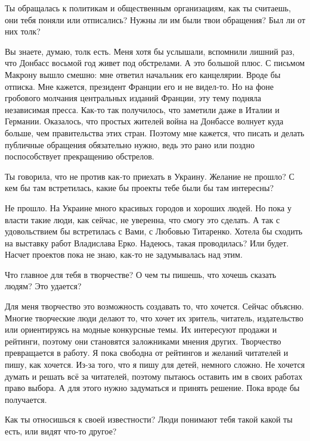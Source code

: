 Ты обращалась к политикам и общественным организациям, как ты считаешь, они
тебя поняли или отписались? Нужны ли им были твои обращения? Был ли от них
толк?

Вы знаете, думаю, толк есть. Меня хотя бы услышали, вспомнили лишний раз, что
Донбасс восьмой год живет под обстрелами. А это большой плюс. С письмом Макрону
вышло смешно: мне ответил начальник его канцелярии. Вроде бы отписка. Мне
кажется, президент Франции его и не видел-то. Но на фоне гробового молчания
центральных изданий Франции, эту тему подняла независимая пресса. Как-то так
получилось, что заметили даже в Италии и Германии. Оказалось, что простых
жителей война на Донбассе волнует куда больше, чем правительства этих стран.
Поэтому мне кажется, что писать и делать публичные обращения обязательно нужно,
ведь это рано или поздно поспособствует прекращению обстрелов.

Ты говорила, что не против как-то приехать в Украину. Желание не прошло? С кем
бы там встретилась, какие бы проекты тебе были бы там интересны?

Не прошло. На Украине много красивых городов и хороших людей. Но пока у власти
такие люди, как сейчас, не уверенна, что смогу это сделать. А так с
удовольствием бы встретилась с Вами, с Любовью Титаренко. Хотела бы сходить на
выставку работ Владислава Ерко. Надеюсь, такая проводилась? Или будет. Насчет
проектов пока не знаю, как-то не задумывалась над этим.

Что главное для тебя в творчестве? О чем ты пишешь, что хочешь сказать людям?
Это удается?

Для меня творчество это возможность создавать то, что хочется. Сейчас объясню.
Многие творческие люди делают то, что хочет их зритель, читатель, издательство
или ориентируясь на модные конкурсные темы. Их интересуют продажи и рейтинги,
поэтому они становятся заложниками мнения других. Творчество превращается в
работу. Я пока свободна от рейтингов и желаний читателей и пишу, как хочется.
Из-за того, что я пишу для детей, немного сложно. Не хочется думать и решать
всё за читателей, поэтому пытаюсь оставить им в своих работах право выбора. А
для этого нужно задуматься и принять решение. Пока вроде бы получается.

Как ты относишься к своей известности? Люди понимают тебя такой какой ты есть,
или видят что-то другое?

